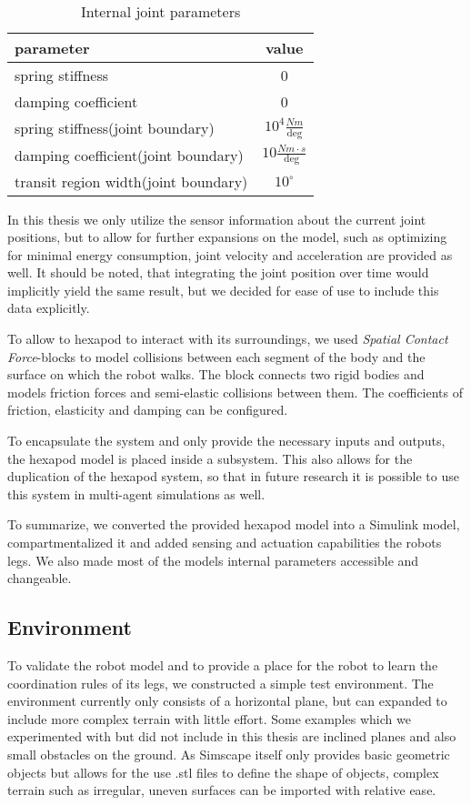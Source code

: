 \begin{table}
	\centering
	\begin{tabular}{| l | c |}
		\hline
		\textbf{parameter} & \textbf{value} \\
		\hline
		spring stiffness & 0 \\
		\hline
		damping coefficient & 0 \\
		\hline
		spring stiffness(joint boundary) & $10^4 \frac{Nm}{\text{deg}}$ \\
		\hline
		damping coefficient(joint boundary) &  $10 \frac{Nm \cdot s}{\text{deg}}$\\
		\hline
		transit region width(joint boundary) &  $10^{\circ}$\\
		\hline
	\end{tabular}
	\caption{Internal joint parameters}
	\label{table: Joint parameters}
\end{table}


In this thesis we only utilize the sensor information about the current joint positions, but to allow for further expansions on the model, such as optimizing for minimal energy consumption, joint velocity and acceleration are provided as well.
It should be noted, that integrating the joint position over time would implicitly yield the same result, but we decided for ease of use to include this data explicitly.

To allow to hexapod to interact with its surroundings, we used \textit{Spatial Contact Force}-blocks to model collisions between each segment of the body and the surface on which the robot walks.
The block connects two rigid bodies and models friction forces and semi-elastic collisions between them.
The coefficients of friction, elasticity and damping can be configured.

To encapsulate the system and only provide the necessary inputs and outputs, the hexapod model is placed inside a subsystem.
This also allows for the duplication of the hexapod system, so that in future research it is possible to use this system in multi-agent simulations as well.

To summarize, we converted the provided hexapod model into a Simulink model, compartmentalized it and added sensing and actuation capabilities the robots legs.
We also made most of the models internal parameters accessible and changeable.


\subsection{Environment}
To validate the robot model and to provide a place for the robot to learn the coordination rules of its legs, we constructed a simple test environment.
The environment currently only consists of a horizontal plane, but can expanded to include more complex terrain with little effort.
Some examples which we experimented with but did not include in this thesis are inclined planes and also small obstacles on the ground.
As Simscape itself only provides basic geometric objects but allows for the use .stl files to define the shape of objects, complex terrain such as irregular, uneven surfaces can be imported with relative ease.

